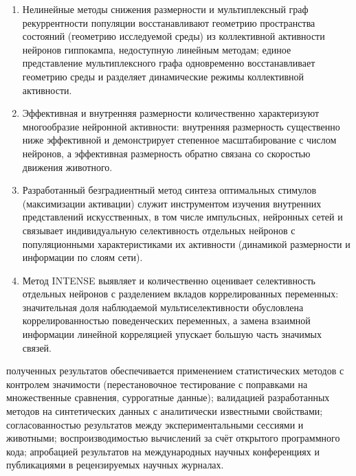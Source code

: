 {}
\begin{enumerate}[beginpenalty=10000] %
  \item Нелинейные методы снижения размерности и мультиплексный граф
  рекуррентности популяции восстанавливают геометрию пространства состояний
  (геометрию исследуемой среды) из коллективной активности нейронов гиппокампа,
  недоступную линейным методам; единое представление мультиплексного графа
  одновременно восстанавливает геометрию среды и разделяет динамические режимы
  коллективной активности.
  \item Эффективная и внутренняя размерности количественно характеризуют
  многообразие нейронной активности: внутренняя размерность существенно ниже
  эффективной и демонстрирует степенное масштабирование с числом нейронов,
  а эффективная размерность обратно связана со скоростью движения животного.
  \item Разработанный безградиентный метод синтеза оптимальных стимулов
  (максимизации активации) служит инструментом изучения внутренних представлений
  искусственных, в том числе импульсных, нейронных сетей и связывает
  индивидуальную селективность отдельных нейронов с популяционными
  характеристиками их активности (динамикой размерности и информации по слоям
  сети).
  \item Метод INTENSE выявляет и количественно оценивает селективность отдельных
  нейронов с разделением вкладов коррелированных переменных: значительная доля
  наблюдаемой мультиселективности обусловлена коррелированностью поведенческих
  переменных, а замена взаимной информации линейной корреляцией упускает большую
  часть значимых связей.
\end{enumerate}


{\reliability} полученных результатов обеспечивается применением статистических
методов с контролем значимости (перестановочное тестирование с поправками
на множественные сравнения, суррогатные данные); валидацией разработанных
методов на синтетических данных с аналитически известными свойствами;
согласованностью результатов между экспериментальными сессиями и животными;
воспроизводимостью вычислений за счёт открытого программного кода; апробацией
результатов на международных научных конференциях и публикациями
в рецензируемых научных журналах.


